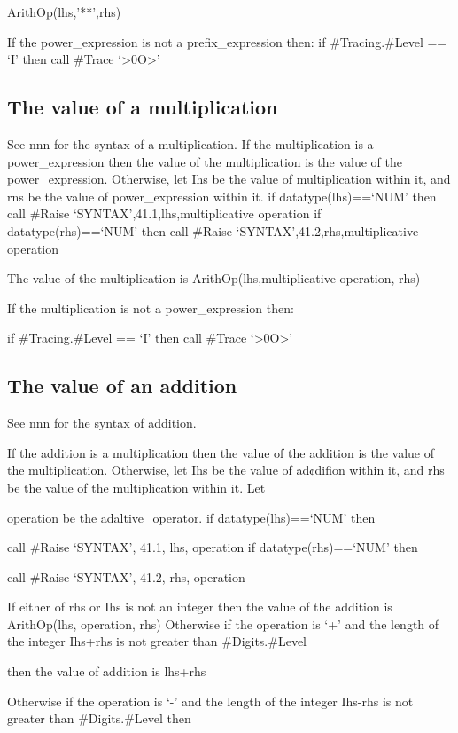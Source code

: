 ArithOp(lhs,'**',rhs)

If the power\_expression is not a prefix\_expression then: if
\#Tracing.\#Level == `I' then call \#Trace
`\textgreater0O\textgreater{}'

\subsection{The value of a
multiplication}\label{the-value-of-a-multiplication}

See nnn for the syntax of a multiplication. If the multiplication is a
power\_expression then the value of the multiplication is the value of
the power\_expression. Otherwise, let Ihs be the value of multiplication
within it, and rns be the value of power\_expression within it. if
datatype(lhs)==`NUM' then call \#Raise `SYNTAX',41.1,lhs,multiplicative
operation if datatype(rhs)==`NUM' then call \#Raise
`SYNTAX',41.2,rhs,multiplicative operation

The value of the multiplication is ArithOp(lhs,multiplicative operation,
rhs)

If the multiplication is not a power\_expression then:

if \#Tracing.\#Level == `I' then call \#Trace
`\textgreater0O\textgreater{}'

\subsection{The value of an addition}\label{the-value-of-an-addition}

See nnn for the syntax of addition.

If the addition is a multiplication then the value of the addition is
the value of the multiplication. Otherwise, let Ihs be the value of
ad¢difion within it, and rhs be the value of the multiplication within
it. Let

operation be the adaltive\_operator. if datatype(lhs)==`NUM' then

call \#Raise `SYNTAX', 41.1, lhs, operation if datatype(rhs)==`NUM' then

call \#Raise `SYNTAX', 41.2, rhs, operation

If either of rhs or Ihs is not an integer then the value of the addition
is ArithOp(lhs, operation, rhs) Otherwise if the operation is `+' and
the length of the integer Ihs+rhs is not greater than \#Digits.\#Level

then the value of addition is lhs+rhs

Otherwise if the operation is `-' and the length of the integer Ihs-rhs
is not greater than \#Digits.\#Level then

